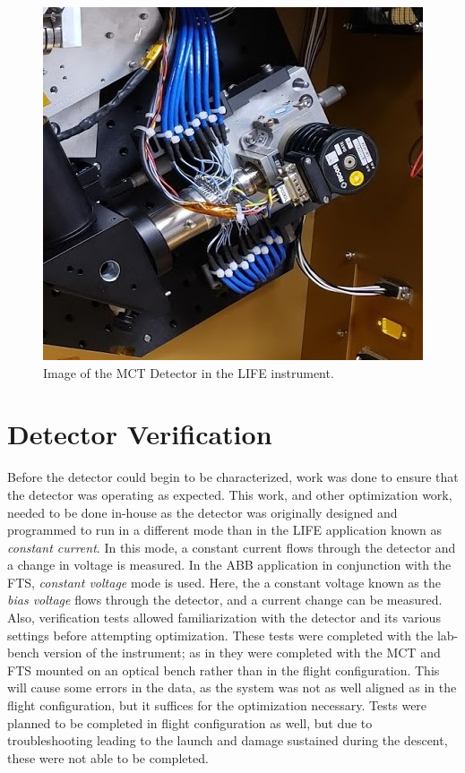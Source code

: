 \begin{figure}[h]
  \centering
  \includegraphics[width=0.6\linewidth]{chap5_images/detector_in_LIFE.jpg}
  \caption{Image of the MCT Detector in the LIFE instrument.}
  \label{fig:life_detector_from_ICD}
\end{figure}

\section{Detector Verification}\label{detector_verif}
Before the detector could begin to be characterized, work was done to ensure that the detector was operating as expected. This work, and other optimization work, needed to be done in-house as the detector was originally designed and programmed to run in a different mode than in the LIFE application known as \textit{constant current}. In this mode, a constant current flows through the detector and a change in voltage is measured. In the ABB application in conjunction with the FTS, \textit{constant voltage} mode is used. Here, the a constant voltage known as the \textit{bias voltage} flows through the detector, and a current change can be measured. Also, verification tests allowed familiarization with the detector and its various settings before attempting optimization. These tests were completed with the lab-bench version of the instrument; as in they were completed with the MCT and FTS mounted on an optical bench rather than in the flight configuration. This will cause some errors in the data, as the system was not as well aligned as in the flight configuration, but it suffices for the optimization necessary. Tests were planned to be completed in flight configuration as well, but due to troubleshooting leading to the launch and damage sustained during the descent, these were not able to be completed.

